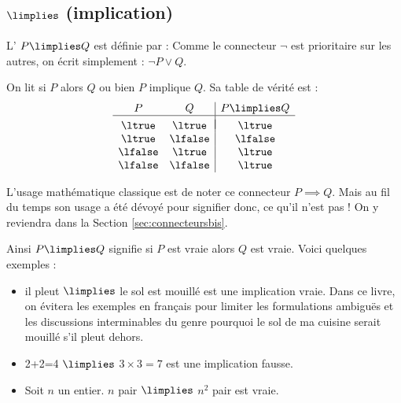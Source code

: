 \documentclass[11pt,class=report,crop=false]{standalone}
\begin{document}
\subsection{$\limplies$ (implication)}

L' $P \limplies Q$ est définie par :
 Comme le connecteur $\lnot$ est prioritaire sur les autres, on écrit simplement : $\lnot P \lor Q$.

On lit \og{}si $P$ alors $Q$\fg{} ou bien \og{}$P$ implique $Q$\fg{}.
Sa table de vérité est :
\[
\begin{array}{c c | c}
	P		& Q 		& P \limplies Q \\
	\hline
	&&	\\[-2ex]
	\ltrue 	& \ltrue 	& \ltrue \\
	\ltrue 	& \lfalse 	& \lfalse \\
	\lfalse & \ltrue 	& \ltrue \\	
	\lfalse & \lfalse 	& \ltrue \\		
\end{array}
\]

L'usage mathématique classique est de noter ce connecteur $P \implies Q$. Mais au fil du temps son usage a été dévoyé pour signifier \og{}donc\fg{}, ce qu'il n'est pas ! On y reviendra dans la Section \ref{sec:connecteursbis}.

Ainsi \og{}$P \limplies Q$\fg{} signifie \og{}si $P$ est vraie alors $Q$ est vraie\fg{}.
Voici quelques exemples :
\begin{itemize}	
	\item \og{}il pleut\fg{} $\limplies$ \og{}le sol est mouillé\fg{} est une implication vraie. Dans ce livre, on évitera les exemples en français pour limiter les formulations ambiguës et les discussions interminables du genre \og{}pourquoi le sol de ma cuisine serait mouillé s'il pleut dehors\fg{}.
		
	\item \og{}2+2=4\fg{} $\limplies$ \og{}$3 \times 3 = 7$\fg{} est une implication fausse.
	
	\item Soit $n$ un entier. \og{}$n$ pair\fg{} $\limplies$ \og{}$n^2$ pair\fg{} est vraie.	
\end{itemize}

\bigskip
\end{document}
